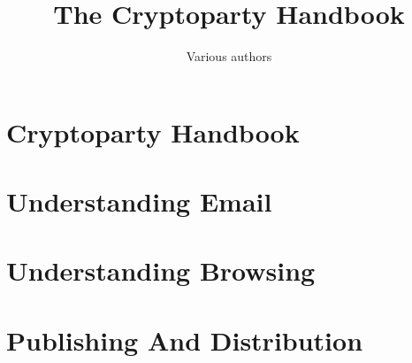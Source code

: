 \documentclass[oribibl]{scrbook}
\begin{document}
\title{The Cryptoparty Handbook}
\author{Various authors}

\maketitle
\tableofcontents
\clearpage
\graphicspath{{./chapter_00_cryptoparty_handbook/}}
\chapter{Cryptoparty Handbook}
\clearpage

\clearpage

\clearpage

\clearpage

\clearpage

\graphicspath{{./chapter_01_understanding_email/}}
\chapter{Understanding Email}
\clearpage

\clearpage

\clearpage

\clearpage

\clearpage

\graphicspath{{./chapter_02_understanding_browsing/}}
\chapter{Understanding Browsing}
\clearpage

\clearpage

\clearpage

\clearpage

\clearpage

\clearpage

\clearpage

\graphicspath{{./chapter_03_publishing_and_distribution/}}
\chapter{Publishing And Distribution}
\clearpage

\clearpage

\clearpage

\graphicspath{{./chapter_04_secure_calls_and_sms/}}
\end{document}
